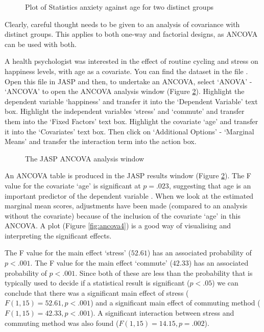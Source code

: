 \begin{figure}[!htb]
\begin{center}
\caption{Plot of Statistics anxiety against age for two distinct groups}
\label{fig:ancova_groups}
\HR
\end{center}
\end{figure}

Clearly, careful thought needs to be given to an analysis of covariance with distinct groups. This applies to both one-way and factorial designs, as ANCOVA can be used with both.


A health psychologist was interested in the effect of routine cycling and stress on happiness levels, with age as a covariate. You can find the dataset in the file . Open this file in JASP and then, to undertake an ANCOVA, select `ANOVA' - `ANCOVA' to open the ANCOVA analysis window (Figure \ref{fig:ancova1}). Highlight the dependent variable ‘happiness’ and transfer it into the ‘Dependent Variable’ text box. Highlight the independent variables  ‘stress’ and ‘commute’ and transfer them  into the ‘Fixed Factors’ text box. Highlight the covariate ‘age’ and transfer it  into the ‘Covariates’ text box. Then click on `Additional Options' - `Marginal Means' and transfer the interaction term  into the action box. 

\begin{figure}[!htb]
\begin{center}
\caption{The JASP ANCOVA analysis window}
\label{fig:ancova1}
\HR
\end{center}
\end{figure}

An ANCOVA table is produced in the JASP results window (Figure \ref{fig:ancova1}). The F value for the covariate ‘age’ is significant at $p=.023$, suggesting that age is an important predictor of the dependent variable . When we look at the estimated marginal mean scores, adjustments have been made (compared to an analysis without the covariate) because of the inclusion of the covariate ‘age’ in this ANCOVA. A plot (Figure \ref{fig:ancova4}) is a good way of visualising and interpreting the significant effects. 

The F value for the main effect ‘stress’ ($52.61$) has an associated probability of $p<.001$. The F value for the main effect ‘commute’ ($42.33$) has an associated probability of $p<.001$. Since both of these are less than the probability that is typically used to decide if a statistical result is significant ($p<.05$) we can conclude that there was a significant main effect of stress ($F(1,15)=52.61, p<.001$) and a significant main effect of commuting method ($F(1,15)=42.33, p<.001$). A significant interaction between stress and commuting method was also found ($F(1,15)=14.15, p=.002$).

